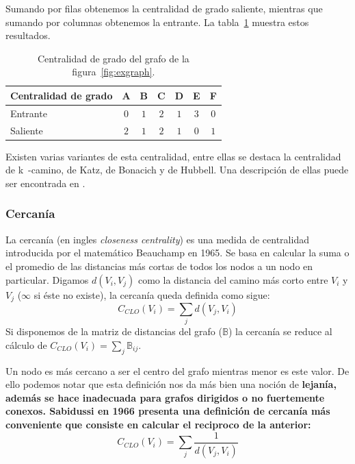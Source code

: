 Sumando por filas obtenemos la centralidad de grado saliente, mientras que
sumando por columnas obtenemos la entrante. La tabla~\ref{tab:excgrad} muestra
estos resultados.
\begin{table}[htpb]
  \centering
  \begin{tabular}{|l|c|c|c|c|c|c|}
    \hline
    Centralidad de grado &  A  &  B  &  C  &  D  &  E  &  F  \\\hline
    Entrante             & $0$ & $1$ & $2$ & $1$ & $3$ & $0$ \\\hline
    Saliente             & $2$ & $1$ & $2$ & $1$ & $0$ & $1$ \\\hline
  \end{tabular}
  \caption{Centralidad de grado del grafo de la figura~\ref{fig:exgraph}.}
  \label{tab:excgrad}
\end{table}

Existen varias variantes de esta centralidad, entre ellas se destaca la
centralidad de k~-camino, de Katz, de Bonacich y de Hubbell. Una descripción de
ellas puede ser encontrada en \cite{sun2011survey}.

\subsubsection{Cercanía}
La cercanía (en ingles \emph{closeness centrality}) es una medida de centralidad
introducida por el matemático Beauchamp en 1965\cite{beauchamp1965improved}. Se
basa en calcular la suma o el promedio de las distancias más cortas de todos los
nodos a un nodo en particular. Digamos $d(V_i, V_j)$ como la distancia del
camino más corto entre $V_i$ y $V_j$ ($\infty$ si éste no existe), la cercanía
queda definida como sigue:
\begin{equation}
  \label{eq:far}
  C_{CLO}(V_i) = \sum_{j} d(V_j, V_i)
\end{equation}
Si disponemos de la matriz de distancias del grafo ($\mathbb{B}$) la cercanía
se reduce al cálculo de $ C_{CLO}(V_i) = \sum_{j} \mathbb{B}_{ij} $.

Un nodo es más cercano a ser el centro del grafo mientras menor es este valor.
De ello podemos notar que esta definición nos da más bien una noción de
\bf{lejanía}, además se hace inadecuada para grafos dirigidos o no fuertemente
conexos. Sabidussi en 1966\cite{sabidussi1966centrality} presenta una definición
de cercanía más conveniente que consiste en calcular el reciproco de la
anterior: 
\begin{equation}
  \label{eq:clo}
  C_{CLO}(V_i) = \sum_{j} \frac{1}{d(V_j, V_i)}
\end{equation}

